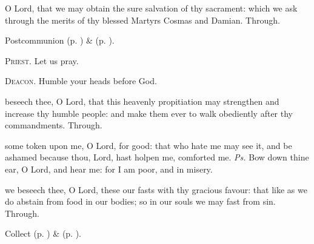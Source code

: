 
\postcommunion
{} O Lord, that we may obtain the sure salvation of thy sacrament: which we ask through the merits of thy blessed Martyrs Cosmas and Damian. Through.
\begin{rubric}
     Postcommunion  (p. \pageref{AshWednesdayMassPostcommunion}) \&   (p. \pageref{SPLivingDeparted}).
\end{rubric}

\textsc{Priest.} Let us pray.\par
\textsc{Deacon.} Humble your heads before God.\par
{} beseech thee, O Lord, that this heavenly propitiation may strengthen and increase thy humble people: and make them ever to walk obediently after thy commandments. Through.


\clearpage
{}
\introit
{} some token upon me, O Lord, for good: that who hate me may see it, and be ashamed because thou, Lord, hast holpen me, comforted me. \textit{Ps.} Bow down thine ear, O Lord, and hear me: for I am poor, and in misery.

\collect
{} we beseech thee, O Lord, these our fasts with thy gracious favour: that like as we do abstain from food in our bodies; so in our souls we may fast from sin. Through.
\begin{rubric}
     Collect  (p. \pageref{AshWednesdayMassCollect}) \&   (p. \pageref{SPLivingDeparted}).
\end{rubric}

